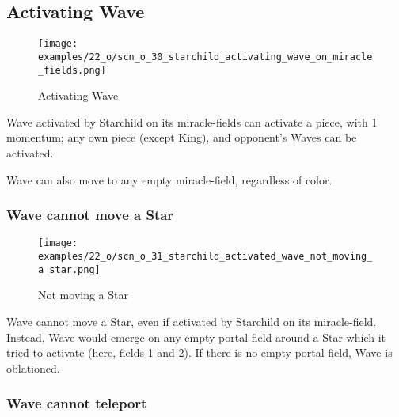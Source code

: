 \subsection*{Activating Wave}
\label{sec:One/Starchild/Activating Wave}

\noindent
\begin{wrapfigure}[8]{l}{0.4\textwidth}
\centering
\texttt{[image: examples/22\_o/scn\_o\_30\_starchild\_activating\_wave\_on\_miracle\_fields.png]}
\caption{Activating Wave}
\label{fig:scn_o_30_starchild_activating_wave_on_miracle_fields}
\end{wrapfigure}
Wave activated by Starchild on its miracle-fields can activate a piece, with
1 momentum; any own piece (except King), and opponent's Waves can be activated.

Wave can also move to any empty miracle-field, regardless of color.

\subsubsection*{Wave cannot move a Star}
\label{sec:One/Starchild/Activating Wave/Wave cannot move a Star}

\noindent
\begin{wrapfigure}[9]{l}{0.4\textwidth}
\centering
\texttt{[image: examples/22\_o/scn\_o\_31\_starchild\_activated\_wave\_not\_moving\_a\_star.png]}
\caption{Not moving a Star}
\label{fig:scn_o_31_starchild_activated_wave_not_moving_a_star}
\end{wrapfigure}
Wave cannot move a Star, even if activated by Starchild on its miracle-field.
Instead, Wave would emerge on any empty portal-field around a Star which it tried
to activate (here, fields 1 and 2). If there is no empty portal-field, Wave is
oblationed.

\clearpage %

\subsubsection*{Wave cannot teleport}
\label{sec:One/Starchild/Activating Wave/Wave cannot teleport}

